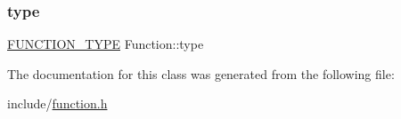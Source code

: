\mbox{\label{classFunction_a07d7969dbcf44a6a066c6e042a02983d}} 
\subsubsection{\texorpdfstring{type}{type}}
{\footnotesize\ttfamily \hyperlink{statics_8h_a025d9866e39f51183a23b3e2165f0e77}{F\+U\+N\+C\+T\+I\+O\+N\+\_\+\+T\+Y\+PE} Function\+::type}



The documentation for this class was generated from the following file\+:\begin{DoxyCompactItemize}
\item 
include/\hyperlink{function_8h}{function.\+h}\end{DoxyCompactItemize}
